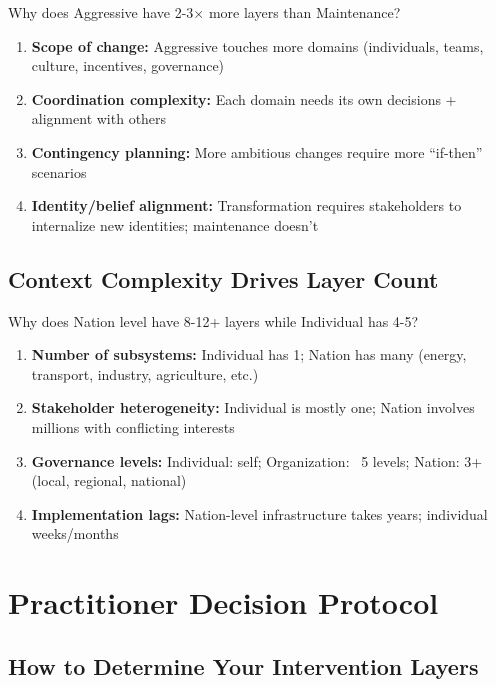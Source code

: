 \documentclass[11pt, a4paper]{article}
\begin{document}
Why does Aggressive have 2-3$\times$ more layers than Maintenance?

\begin{enumerate}
    \item \textbf{Scope of change:} Aggressive touches more domains (individuals, teams, culture, incentives, governance)
    \item \textbf{Coordination complexity:} Each domain needs its own decisions + alignment with others
    \item \textbf{Contingency planning:} More ambitious changes require more ``if-then'' scenarios
    \item \textbf{Identity/belief alignment:} Transformation requires stakeholders to internalize new identities; maintenance doesn't
\end{enumerate}

\subsection{Context Complexity Drives Layer Count}

Why does Nation level have 8-12+ layers while Individual has 4-5?

\begin{enumerate}
    \item \textbf{Number of subsystems:} Individual has 1; Nation has many (energy, transport, industry, agriculture, etc.)
    \item \textbf{Stakeholder heterogeneity:} Individual is mostly one; Nation involves millions with conflicting interests
    \item \textbf{Governance levels:} Individual: self; Organization: ~5 levels; Nation: 3+ (local, regional, national)
    \item \textbf{Implementation lags:} Nation-level infrastructure takes years; individual weeks/months
\end{enumerate}

\section{Practitioner Decision Protocol}

\subsection{How to Determine Your Intervention Layers}
\end{document}
